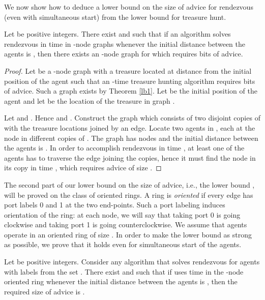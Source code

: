\documentclass{llncs}
\begin{document}
We now show how to deduce a lower bound on the size of advice for rendezvous (even with simultaneous start) from the lower bound for treasure hunt.

\begin{corollary}\label{cor}
Let  be positive integers. 
There exist  and  such that 
if an algorithm  solves rendezvous in time  in -node graphs
whenever the initial distance between the agents is , then there exists an -node graph for which  requires
 bits of advice.
\end{corollary}

\begin{proof}
Let  be a -node graph with a treasure located at distance  from the initial position of the agent
such that an -time treasure hunting algorithm requires  bits of advice. Such a graph exists by
Theorem \ref{lb1}. Let  be the initial position of the agent and let  be the location of the treasure in graph . 

Let  and . Hence  and .
Construct the graph  which consists of two disjoint copies of  with the treasure locations joined by an edge. Locate two agents in , each at the node  in different copies of .
The graph  has  nodes and the initial distance between the agents is . In order to accomplish rendezvous in time , at least one of the agents has to
traverse the edge joining the copies, hence it must find the node  in its copy in time ,  which requires advice of size .
\end{proof}



The second part of our lower bound on the size of advice, i.e., the lower bound , will be proved on the class of oriented rings.
A ring is {\em oriented} if every edge has port labels 0 and 1 at the two end-points.
Such a port labeling induces orientation of the ring: at each node, we will say that taking port 0 is going clockwise and taking port 1 is going counterclockwise.
We assume that agents operate in an oriented ring of size . In order to make the lower bound as strong as possible, we prove that it holds even for simultaneous start of the agents. 

\begin{theorem}\label{lb2}
Let  be positive integers. Consider any algorithm  that solves rendezvous for agents with labels from the set . 
There exist  and  such that if  uses time   in the -node oriented ring whenever the initial distance between the agents is , then the required size of advice is
.
\end{theorem}
\end{document}
